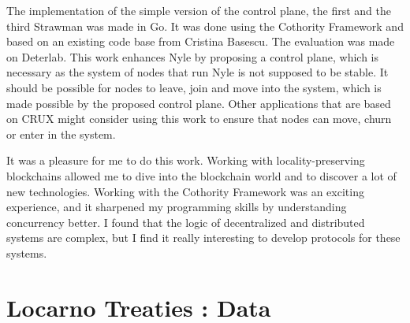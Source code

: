 \documentclass[a4paper,11pt,twoside=semi,openright]{report}
\begin{document}
The implementation of the simple version of the control plane, the first and
the third Strawman was made in Go. It was done using the Cothority Framework
and based on an existing code base from Cristina Basescu. The evaluation was
made on Deterlab. This work enhances Nyle by proposing a control plane, which
is necessary as the system of nodes that run Nyle is not supposed to be
stable. It should be possible for nodes to leave, join and move into the
system, which is made possible by the proposed control plane. Other
applications that are based on CRUX \cite{Basescu2014} might consider using
this work to ensure that nodes can move, churn or enter in the system.

It was a pleasure for me to do this work. Working with locality-preserving
blockchains allowed me to dive into the blockchain world and to discover a lot
of new technologies. Working with the Cothority Framework was an exciting
experience, and it sharpened my programming skills by understanding concurrency
better. I found that the logic of decentralized and distributed systems are
complex, but I find it really interesting to develop protocols for these
systems. 


\cleardoublepage {} {}

\printbibliography

\let\savecleardoublepage\cleardoublepage
\let\cleardoublepage\clearpage 
\appendix %

\chapter{Locarno Treaties : Data} \label{app:LocarnoTreaties-data}
\end{document}
